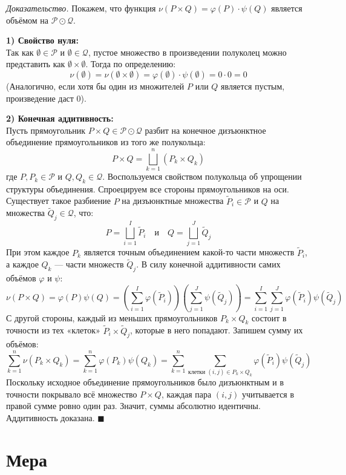 \documentclass[12pt,a4paper]{article}
\newenvironment{Proof}[1][Доказательство]{\vspace{0.5em}\noindent\textit{#1.}\hspace{0.5em}\ignorespaces}{\hfill$\blacksquare$\vspace{1em}}
\begin{document}
\begin{Proof}
Покажем, что функция $\nu(P \times Q) = \varphi(P) \cdot \psi(Q)$ является объёмом на $\mathcal{P} \odot \mathcal{Q}$.

\textbf{1) Свойство нуля:} \\
Так как $\emptyset \in \mathcal{P}$ и $\emptyset \in \mathcal{Q}$, пустое множество в произведении полуколец можно представить как $\emptyset \times \emptyset$.
Тогда по определению:
$$ \nu(\emptyset) = \nu(\emptyset \times \emptyset) = \varphi(\emptyset) \cdot \psi(\emptyset) = 0 \cdot 0 = 0 $$
(Аналогично, если хотя бы один из множителей $P$ или $Q$ является пустым, произведение даст $0$).

\textbf{2) Конечная аддитивность:} \\
Пусть прямоугольник $P \times Q \in \mathcal{P} \odot \mathcal{Q}$ разбит на конечное дизъюнктное объединение прямоугольников из того же полукольца:
$$ P \times Q = \bigsqcup\limits_{k=1}^n (P_k \times Q_k) $$
где $P, P_k \in \mathcal{P}$ и $Q, Q_k \in \mathcal{Q}$.
Воспользуемся свойством полукольца об упрощении структуры объединения. Спроецируем все стороны прямоугольников на оси. Существует такое разбиение $P$ на дизъюнктные множества $\tilde{P}_i \in \mathcal{P}$ и $Q$ на множества $\tilde{Q}_j \in \mathcal{Q}$, что:
$$ P = \bigsqcup\limits_{i=1}^{I} \tilde{P}_i \quad \text{и} \quad Q = \bigsqcup\limits_{j=1}^{J} \tilde{Q}_j $$
При этом каждое $P_k$ является точным объединением какой-то части множеств $\tilde{P}_i$, а каждое $Q_k$ — части множеств $\tilde{Q}_j$.
В силу конечной аддитивности самих объёмов $\varphi$ и $\psi$:
$$ \nu(P \times Q) = \varphi(P)\psi(Q) = \left( \sum\limits_{i=1}^{I} \varphi(\tilde{P}_i) \right) \left( \sum\limits_{j=1}^{J} \psi(\tilde{Q}_j) \right) = \sum\limits_{i=1}^{I} \sum\limits_{j=1}^{J} \varphi(\tilde{P}_i)\psi(\tilde{Q}_j) $$
С другой стороны, каждый из меньших прямоугольников $P_k \times Q_k$ состоит в точности из тех «клеток» $\tilde{P}_i \times \tilde{Q}_j$, которые в него попадают. Запишем сумму их объёмов:
$$ \sum\limits_{k=1}^n \nu(P_k \times Q_k) = \sum\limits_{k=1}^n \varphi(P_k)\psi(Q_k) = \sum\limits_{k=1}^n \sum\limits_{\text{клетки } (i, j) \in P_k \times Q_k} \varphi(\tilde{P}_i)\psi(\tilde{Q}_j) $$
Поскольку исходное объединение прямоугольников было дизъюнктным и в точности покрывало всё множество $P \times Q$, каждая пара $(i, j)$ учитывается в правой сумме ровно один раз. Значит, суммы абсолютно идентичны. Аддитивность доказана.
\end{Proof}
\section{Мера}
\end{document}
